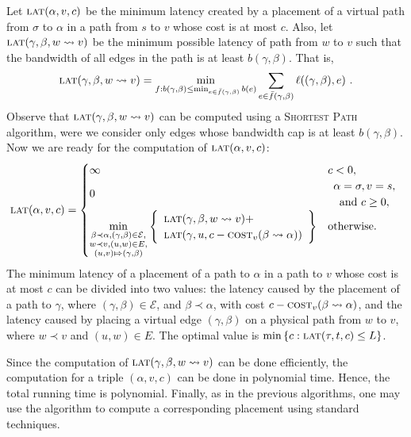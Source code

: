 \documentclass[runningheads]{llncs}
\newcommand{\set}[1]{\left\{ #1 \right\}}
\newcommand{\calE}{\mathcal{E}}
\newcommand{\cost}{\textsc{cost}\xspace}
\newcommand{\latency}{\textsc{lat}\xspace}
\begin{document}
Let $\latency(\alpha,v,c)$ be the minimum latency created by a
placement of a virtual path from $\sigma$ to $\alpha$ in a path from
$s$ to $v$ whose cost is at most $c$.
%
Also, let $\latency(\gamma,\beta,w \leadsto v)$ be the minimum
possible latency of path from $w$ to $v$ such that the bandwidth of
all edges in the path is at least $b(\gamma,\beta)$.  That is,
\[ 
\latency(\gamma,\beta,w \leadsto v)
= \min_{f: b(\gamma,\beta) \leq \min_{e \in \bar{f}(\gamma,\beta)} b(e)}
    \sum_{e \in \bar{f}(\gamma,\beta)} \ell((\gamma,\beta),e)
~.
\]
Observe that $\latency(\gamma,\beta,w \leadsto v)$ can be computed
using a \textsc{Shortest Path} algorithm, were we consider only edges
whose bandwidth cap is at least $b(\gamma,\beta)$.
%
Now we are ready for the computation of $\latency(\alpha,v,c)$:
\[
\latency(\alpha,v,c) =
\begin{cases}
\infty  &  c < 0,\\
0       &
\begin{array}{c}
\alpha = \sigma, v = s, \\
\text{and } c \geq 0,
\end{array} \\
\displaystyle
\min_{
  \substack{\beta \prec \alpha, (\gamma,\beta) \in \calE, \\
           w \prec v, (u,w) \in E, \\
         (u,v) \Mapsto (\gamma,\beta)}
     }
     \set{\begin{array}{l}
          \latency(\gamma,\beta,w \leadsto v) + \\
          \latency(\gamma,u,c - \cost_v(\beta \leadsto \alpha))
          \end{array}
     }
  & \text{otherwise}.
\end{cases}
\]
The minimum latency of a placement of a path to $\alpha$ in a path to
$v$ whose cost is at most $c$ can be divided into two values: the
latency caused by the placement of a path to $\gamma$, where
$(\gamma,\beta) \in \calE$, and $\beta \prec \alpha$, with cost $c -
\cost_v(\beta \leadsto \alpha)$, and the latency caused by placing a
virtual edge $(\gamma,\beta)$ on a physical path from $w$ to $v$,
where $w \prec v$ and $(u,w) \in E$.
%
The optimal value is $\min \set{c : \latency(\tau,t,c) \leq L}$.

Since the computation of $\latency(\gamma,\beta,w \leadsto v)$ can be
done efficiently, the computation for a triple $(\alpha,v,c)$ can be
done in polynomial time.  Hence, the total running time is polynomial.
Finally, as in the previous algorithms, one may use the algorithm to
compute a corresponding placement
using standard techniques.
\end{document}
